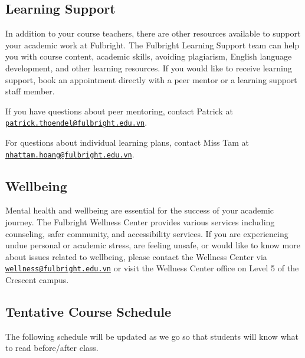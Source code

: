 \documentclass[
]{article}
\begin{document}
\hypertarget{learning-support}{%
\subsection*{Learning Support}\label{learning-support}}

In addition to your course teachers, there are other resources available to support your academic work at Fulbright. The Fulbright Learning Support team can help you with course content, academic skills, avoiding plagiarism, English language development, and other learning resources.
If you would like to receive learning support, book an appointment directly with a peer mentor or a learning support staff member.

If you have questions about peer mentoring, contact Patrick at \href{mailto:patrick.thoendel@fulbright.edu.vn}{\nolinkurl{patrick.thoendel@fulbright.edu.vn}}.

For questions about individual learning plans, contact Miss Tam at \href{mailto:nhattam.hoang@fulbright.edu.vn}{\nolinkurl{nhattam.hoang@fulbright.edu.vn}}.

\hypertarget{wellbeing}{%
\subsection*{Wellbeing}\label{wellbeing}}

Mental health and wellbeing are essential for the success of your academic journey. The
Fulbright Wellness Center provides various services including counseling, safer community,
and accessibility services. If you are experiencing undue personal or academic stress, are
feeling unsafe, or would like to know more about issues related to wellbeing, please contact
the Wellness Center via \href{mailto:wellness@fulbright.edu.vn}{\nolinkurl{wellness@fulbright.edu.vn}} or visit the Wellness Center office on
Level 5 of the Crescent campus.

\newpage

\hypertarget{tentative-course-schedule}{%
\subsection*{Tentative Course Schedule}\label{tentative-course-schedule}}

The following schedule will be updated as we go so that students will know what to read
before/after class.
\end{document}

